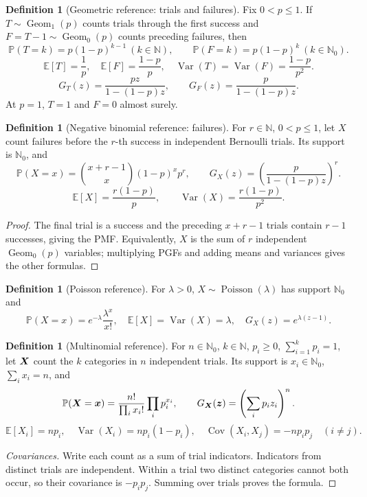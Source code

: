 \documentclass[11pt]{article}
\numberwithin{equation}{section}
\theoremstyle{definition}
\newtheorem{definition}[theorem]{Definition}
\theoremstyle{remark}
\newcommand{\NN}{\mathbb N}
\newcommand{\Prob}{\mathbb P}
\newcommand{\Expt}{\mathbb E}
\DeclareMathOperator{\Var}{Var}
\DeclareMathOperator{\Cov}{Cov}
\newcommand{\Poisson}{\operatorname{Poisson}}
\newcommand{\GeomOne}{\operatorname{Geom}_1}
\newcommand{\GeomZero}{\operatorname{Geom}_0}
\begin{document}
\begin{definition}[Geometric reference: trials and failures]\label{probability-definition-074}
Fix \(0<p\le1\). If \(T\sim\GeomOne(p)\) counts trials through the first
success and \(F=T-1\sim\GeomZero(p)\) counts preceding failures, then
\[\Prob(T=k)=p(1-p)^{k-1}\ (k\in\NN),\qquad
\Prob(F=k)=p(1-p)^k\ (k\in\NN_0).\]
\[\Expt[T]=\frac1p,\quad \Expt[F]=\frac{1-p}{p},\quad
\Var(T)=\Var(F)=\frac{1-p}{p^2}.\]
\[G_T(z)=\frac{pz}{1-(1-p)z},\qquad G_F(z)=\frac{p}{1-(1-p)z}.\]
At \(p=1\), \(T=1\) and \(F=0\) almost surely.
\end{definition}

\begin{definition}[Negative binomial reference: failures]\label{probability-definition-075}
For \(r\in\NN\), \(0<p\le1\), let \(X\) count failures before the
\(r\)-th success in independent Bernoulli trials. Its support is \(\NN_0\), and
\[\Prob(X=x)=\binom{x+r-1}{x}(1-p)^x p^r,\qquad
G_X(z)=\left(\frac{p}{1-(1-p)z}\right)^r.\]
\[\Expt[X]=\frac{r(1-p)}p,\qquad \Var(X)=\frac{r(1-p)}{p^2}.\]
\end{definition}
\begin{proof}\label{probability-proof-095}
The final trial is a success and the preceding \(x+r-1\) trials contain
\(r-1\) successes, giving the PMF. Equivalently, \(X\) is the sum of
\(r\) independent \(\GeomZero(p)\) variables; multiplying PGFs and adding
means and variances gives the other formulas.
\end{proof}

\begin{definition}[Poisson reference]\label{probability-definition-076}
For \(\lambda>0\), \(X\sim\Poisson(\lambda)\) has support \(\NN_0\) and
\[\Prob(X=x)=e^{-\lambda}\frac{\lambda^x}{x!},\quad
\Expt[X]=\Var(X)=\lambda,\quad G_X(z)=e^{\lambda(z-1)}.\]
\end{definition}

\begin{definition}[Multinomial reference]\label{probability-definition-077}
For \(n\in\NN_0\), \(k\in\NN\), \(p_i\ge0\), \(\sum_{i=1}^kp_i=1\),
let \(\vb X\) count the \(k\) categories in \(n\) independent trials.
Its support is \(x_i\in\NN_0\), \(\sum_i x_i=n\), and
\[\Prob(\vb X=\vb x)=\frac{n!}{\prod_i x_i!}\prod_i p_i^{x_i},\qquad
G_{\vb X}(\vb z)=\left(\sum_i p_i z_i\right)^n.\]
\[\Expt[X_i]=np_i,\quad \Var(X_i)=np_i(1-p_i),\quad
\Cov(X_i,X_j)=-np_ip_j\quad(i\ne j).\]
\end{definition}
\begin{proof}[Covariances]\label{probability-proof-096}
Write each count as a sum of trial indicators. Indicators from distinct trials
are independent. Within a trial two distinct categories cannot both occur,
so their covariance is \(-p_ip_j\). Summing over trials proves the formula.
\end{proof}
\end{document}
